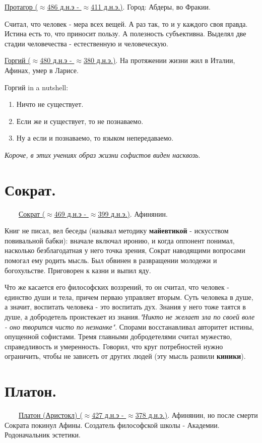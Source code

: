 \documentclass[12pt,a4paper]{article}
\begin{document}
\underline{Протагор ($\approx$486 д.н.э - $\approx$411 д.н.э.)}. Город: Абдеры, во Фракии.

Считал, что человек - мера всех вещей. А раз так, то и у каждого своя правда. Истина есть то, что приносит пользу. А полезность субъективна. Выделял две стадии человечества - естественную  и человеческую.

\underline{Горгий ($\approx$480 д.н.э - $\approx$380 д.н.э.)}. На протяжении жизни жил в Италии, Афинах, умер в Ларисе. 

Горгий in a nutshell:
\begin{enumerate}
\item Ничто не существует.
\item Если же и существует, то не познаваемо.
\item Ну а если и познаваемо, то языком непередаваемо.
\end{enumerate}

\textit{Короче, в этих учениях образ жизни софистов виден насквозь}.

\section{Сократ.}
\ \ \ \
\underline{Сократ ($\approx$469 д.н.э - $\approx$399 д.н.э.)}. Афинянин.

 Книг не писал, вел беседы (называл методику \textbf{майевтикой} - искусством повивальной бабки): вначале включал иронию, и когда оппонент понимал, насколько безблагодатная у него точка зрения, Сократ наводящими вопросами помогал ему родить мысль. Был обвинен в развращении молодежи и богохульстве. Приговорен к казни и выпил яду.

Что же касается его философских воззрений, то он считал, что человек - единство души и тела, причем перваю управляет вторым. Суть человека в душе, а значит, воспитать человека - это воспитать дух. Знания у него тоже таятся в душе, а добродетель проистекает из знания.\textit{"Никто не желает зла по своей воле - оно творится чисто по незнанке"}. Спорами восстанавливал авторитет истины, опущенной софистами. 
Тремя главными добродетелями считал мужество, справедливость и умеренность. Говорил, что круг потребностей нужно ограничить, чтобы не зависеть от других людей (эту мысль развили \textbf{киники}).

\section{Платон.}
\ \ \ \
\underline{Платон (Аристокл) ($\approx$427 д.н.э - $\approx$378 д.н.э.)}. Афинянин, но после смерти Сократа покинул Афины. Создатель философской школы - Академии. Родоначальник эстетики.
\end{document}
